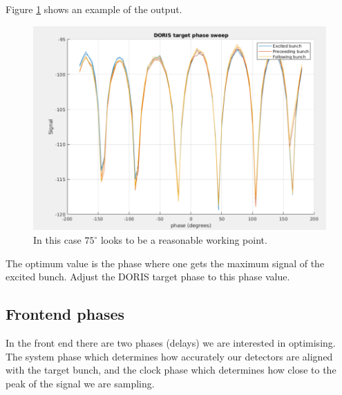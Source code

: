 \documentclass{report}
\begin{document}
Figure \ref{fig:DORIS_phase_scan} shows an example of the output.
\begin{figure}[ht]
    \centering
    \includegraphics[width=0.8\linewidth]{DORIS_scan.png}
    \caption{In this case $75^\circ$ looks to be a reasonable working point.}
    \label{fig:DORIS_phase_scan}
\end{figure}

The optimum value is the phase where one gets the maximum signal of the excited bunch. Adjust the DORIS target phase to this phase value.
\clearpage


\subsection{Frontend phases} 
In the front end there are two phases (delays) we are interested in optimising. The system phase which determines how accurately our detectors are aligned with the target bunch, and the clock phase which determines how close to the peak of the signal we are sampling. 
\end{document}
